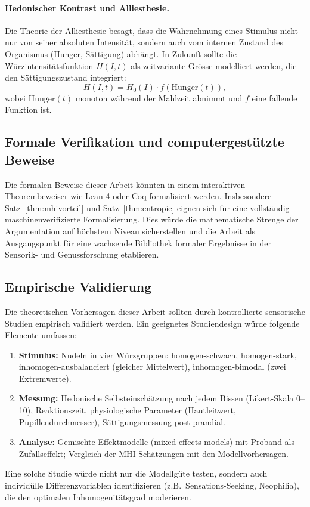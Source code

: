 ﻿\documentclass[12pt,a4paper]{article}
\theoremstyle{definition}
\begin{document}
\paragraph{Hedonischer Kontrast und Alliesthesie.}
Die Theorie der Alliesthesie \cite{cabanac1971} besagt, dass die
Wahrnehmung eines Stimulus nicht nur von seiner absoluten Intensität,
sondern auch vom internen Zustand des Organismus (Hunger, Sättigung)
abhängt. In Zukunft sollte die Würzintensitätsfunktion $H(I,t)$ als
zeitvariante Grösse modelliert werden, die den Sättigungszustand
integriert:
\[
  H(I, t) = H_0(I) \cdot f(\mathrm{Hunger}(t)),
\]
wobei $\mathrm{Hunger}(t)$ monoton während der Mahlzeit abnimmt und
$f$ eine fallende Funktion ist.

\subsection{Formale Verifikation und computergestützte Beweise}

Die formalen Beweise dieser Arbeit könnten in einem interaktiven
Theorembeweiser wie Lean 4 oder Coq formalisiert werden. Insbesondere
Satz~\ref{thm:mhivorteil} und Satz~\ref{thm:entropie} eignen sich
für eine vollständig maschinenverifizierte Formalisierung. Dies würde
die mathematische Strenge der Argumentation auf höchstem Niveau
sicherstellen und die Arbeit als Ausgangspunkt für eine wachsende
Bibliothek formaler Ergebnisse in der Sensorik- und Genussforschung
etablieren.

\subsection{Empirische Validierung}

Die theoretischen Vorhersagen dieser Arbeit sollten durch kontrollierte
sensorische Studien empirisch validiert werden. Ein geeignetes
Studiendesign würde folgende Elemente umfassen:
\begin{enumerate}
  \item \textbf{Stimulus:} Nudeln in vier Würzgruppen: homogen-schwach,
    homogen-stark, inhomogen-ausbalanciert (gleicher Mittelwert),
    inhomogen-bimodal (zwei Extremwerte).
  \item \textbf{Messung:} Hedonische Selbsteinschätzung nach jedem Bissen
    (Likert-Skala 0--10), Reaktionszeit, physiologische Parameter
    (Hautleitwert, Pupillendurchmesser), Sättigungsmessung post-prandial.
  \item \textbf{Analyse:} Gemischte Effektmodelle (mixed-effects models)
    mit Proband als Zufallseffekt; Vergleich der MHI-Sch\"{a}tzungen mit
    den Modellvorhersagen.
\end{enumerate}
Eine solche Studie würde nicht nur die Modellgüte testen, sondern
auch individülle Differenzvariablen identifizieren (z.B.\ Sensations-Seeking,
Neophilia), die den optimalen Inhomogenitätsgrad moderieren.
\end{document}
